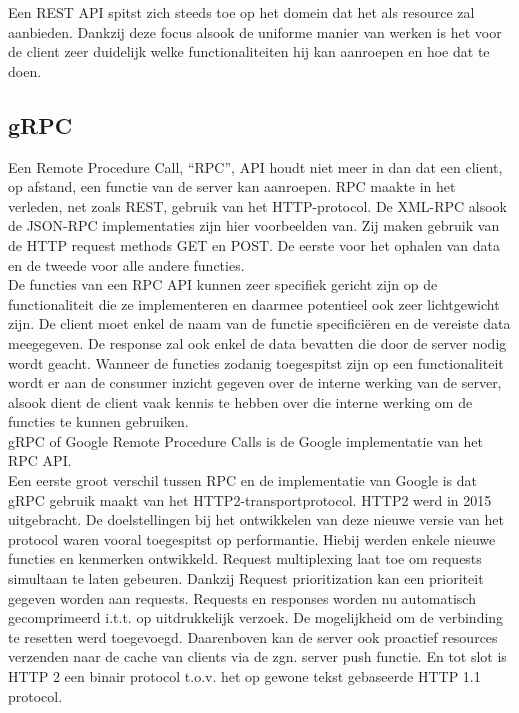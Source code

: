 Een REST API spitst zich steeds toe op het domein dat het als resource zal aanbieden.
Dankzij deze focus alsook de uniforme manier van werken is het voor de client zeer duidelijk welke functionaliteiten hij kan aanroepen en hoe dat te doen.
~\autocite{jscrambler}
~\autocite{hubspot}
~\autocite{HTTP1.1vsHTTP2}\\

\subsection{gRPC}

Een Remote Procedure Call, ``RPC'', API houdt niet meer in dan dat een client, op afstand, een functie van de server kan aanroepen.
RPC maakte in het verleden, net zoals REST, gebruik van het HTTP-protocol. De XML-RPC alsook de JSON-RPC implementaties zijn hier voorbeelden van.
Zij maken gebruik van de HTTP request methods GET en POST. De eerste voor het ophalen van data en de tweede voor alle andere functies.\\

De functies van een RPC API kunnen zeer specifiek gericht zijn op de functionaliteit die ze implementeren en daarmee potentieel ook zeer lichtgewicht zijn.
De client moet enkel de naam van de functie specificiëren en de vereiste data meegegeven. De response zal ook enkel de data bevatten die door de server nodig wordt geacht.
Wanneer de functies zodanig toegespitst zijn op een functionaliteit wordt er aan de consumer inzicht gegeven over de interne werking van de server,
alsook dient de client vaak kennis te hebben over die interne werking om de functies te kunnen gebruiken.
~\autocite{altexsoft}\\

gRPC of Google Remote Procedure Calls is de Google implementatie van het RPC API.\\
Een eerste groot verschil tussen RPC en de implementatie van Google is dat gRPC gebruik maakt van het HTTP2-transportprotocol.
HTTP2 werd in 2015 uitgebracht. De doelstellingen bij het ontwikkelen van deze nieuwe versie van het protocol waren vooral toegespitst op performantie.
Hiebij werden enkele nieuwe functies en kenmerken ontwikkeld. Request multiplexing laat toe om requests simultaan te laten gebeuren.
Dankzij Request prioritization kan een prioriteit gegeven worden aan requests. Requests en responses worden nu automatisch gecomprimeerd i.t.t. op
uitdrukkelijk verzoek. De mogelijkheid om de verbinding te resetten werd toegevoegd. Daarenboven kan de server ook proactief resources verzenden naar de
cache van clients via de zgn. server push functie. En tot slot is HTTP 2 een binair protocol t.o.v. het op gewone tekst gebaseerde HTTP 1.1 protocol.
~\autocite{baeldung}\\

